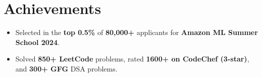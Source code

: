 ﻿\documentclass[letterpaper,10pt]{article}
\newcommand{\resumeItem}[1]{\item\small{#1 \vspace{-2pt}}}
\newcommand{\resumeItemListStart}{\begin{itemize}[leftmargin=*, label=\textbullet]}
\newcommand{\resumeItemListEnd}{\end{itemize}\vspace{-5pt}}
\begin{document}
\section{Achievements}
\resumeItemListStart
  \resumeItem{Selected in the \textbf{top 0.5\%} of \textbf{80,000+} applicants for \textbf{Amazon ML Summer School 2024}.}
  \resumeItem{Solved \textbf{850+ LeetCode} problems, rated \textbf{1600+ on CodeChef (3-star)}, and \textbf{300+ GFG} DSA problems.}
\resumeItemListEnd
\end{document}
